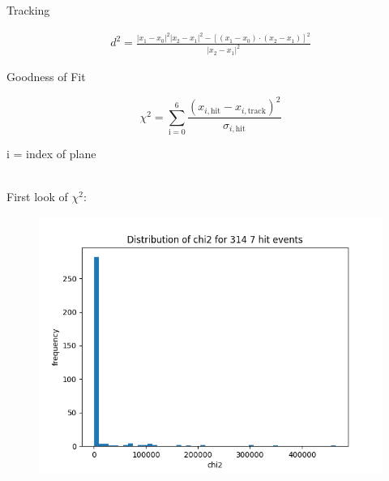 \documentclass{beamer}
\begin{document}
\begin{frame}[fragile]{Tracking}
\begin{minipage}{.4\textwidth}
\begin{figure}[H]
	\end{figure}
    \end{minipage}
    \begin{minipage}{.59\textwidth}
	\footnotesize
	\begin{align*}
	    d^2 = \frac{ \left| x_1-x_0 \right|^2 \left| x_2-x_1 \right|^2
		- \left[ \left( x_1-x_0 \right) \cdot \left( x_2-x_1 \right)
		\right]^2}{\left| x_2-x_1 \right|^2}
	\end{align*}
    \end{minipage}

\end{frame}

\begin{frame}{Goodness of Fit}
    \begin{minipage}{.49\textwidth}
    \[ \chi^2 = \sum_{\text{i} = 0} ^6 \frac{ \left(
	    x _{i,\text{hit}} - x _{i,\text{track}} \right) ^2}{
	    \sigma _{i,\text{hit}}} \]
    \end{minipage}
    \begin{minipage}{.49\textwidth}
    i = index of plane
    \end{minipage}\\[.5cm]
    \pause
    \LARGE First look of \( \chi ^{2} \): \\[.5cm]
    \begin{minipage}{.49\textwidth}
    \begin{figure}[H]
	\centering
	\includegraphics[width=\textwidth]{chi2_firstlook.png}
    \end{figure}
    \end{minipage}
    \begin{minipage}{.49\textwidth}

\end{minipage}
\end{frame}
\end{document}
